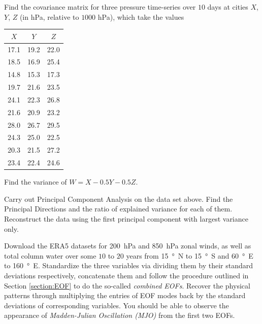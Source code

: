 \begin{Exercise}
Find the covariance matrix for three pressure time-series over $10$ days at cities $X$, $Y$, $Z$ (in hPa, relative to $1000$ hPa), which take the values
\begin{center}
\begin{tabular}{|c|c|c|}
\hline
$X$ & $Y$ & $Z$ \\
\hline
17.1 & 19.2 & 22.0 \\
\hline
18.5 & 16.9 & 25.4 \\
\hline
14.8 & 15.3 & 17.3 \\
\hline
19.7 & 21.6 & 23.5 \\
\hline
24.1 & 22.3 & 26.8 \\
\hline
21.6 & 20.9 & 23.2 \\
\hline 
28.0 & 26.7 & 29.5 \\
\hline
24.3 & 25.0 & 22.5 \\
\hline
20.3 & 21.5 & 27.2 \\
\hline
23.4 & 22.4 & 24.6 \\
\hline
\end{tabular}
\end{center}
Find the variance of $W = X - 0.5Y - 0.5Z$.
\end{Exercise}

\begin{Exercise}
Carry out Principal Component Analysis on the data set above. Find the Principal Directions and the ratio of explained variance for each of them. Reconstruct the data using the first principal component with largest variance only.
\end{Exercise}

\begin{Exercise}
Download the ERA5 datasets for \SI{200}{hPa} and \SI{850}{hPa} zonal winds, as well as total column water over some $10$ to $20$ years from \SI{15}{\degree N} to \SI{15}{\degree S} and \SI{60}{\degree E} to \SI{160}{\degree E}. Standardize the three variables via dividing them by their standard deviations respectively, concatenate them and follow the procedure outlined in Section \ref{section:EOF} to do the so-called \textit{combined EOFs}. Recover the physical patterns through multiplying the entries of EOF modes back by the standard deviations of corresponding variables. You should be able to observe the appearance of \textit{Madden-Julian Oscillation (MJO)} from the first two EOFs. 
\end{Exercise}

